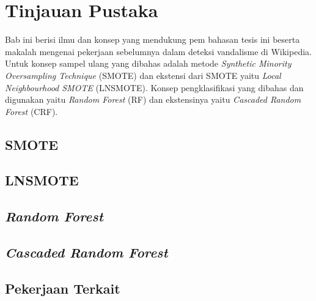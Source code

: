 \chapter{Tinjauan Pustaka}
\label{bab:02}

Bab ini berisi ilmu dan konsep yang mendukung pem bahasan tesis ini beserta
makalah mengenai pekerjaan sebelumnya dalam deteksi vandalisme di Wikipedia.
Untuk konsep sampel ulang yang dibahas adalah metode \textit{Synthetic Minority
Oversampling Technique} (SMOTE) dan ekstensi dari SMOTE yaitu
\textit{Local Neighbourhood SMOTE} (LNSMOTE).
Konsep pengklasifikasi yang dibahas dan digunakan yaitu \textit{Random Forest}
(RF) dan ekstensinya yaitu \textit{Cascaded Random Forest} (CRF).

	\section{SMOTE}
	\label{bab:02:smote}
	

	\section{LNSMOTE}
	\label{bab:02:lnsmote}
	

	\section{\textit{Random Forest}}
	\label{bab:02:rf}
	

	\section{\textit{Cascaded Random Forest}}
	\label{bab:02:crf}
	

	\section{Pekerjaan Terkait}\label{bab:02:pekerjaan_terkait}
	

